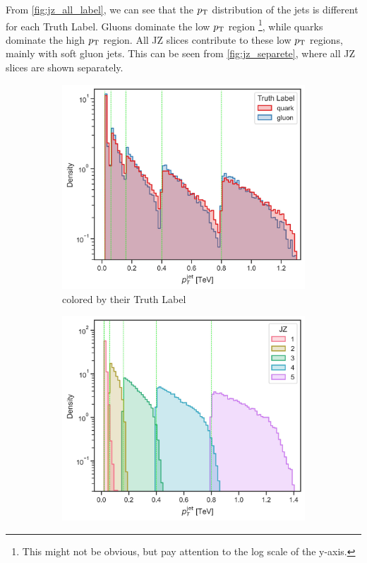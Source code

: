 From \cref{fig:jz_all_label}, we can see that the $p_\text{T}$ distribution of the jets is different for each Truth Label.
Gluons dominate the low $p_\text{T}$ region \footnote{This might not be obvious, but pay attention to the log scale of the y-axis.}, while quarks dominate the high $p_\text{T}$ region.
All JZ slices contribute to these low $p_\text{T}$ regions, mainly with soft gluon jets.
This can be seen from \cref{fig:jz_separete}, where all JZ slices are shown separately.
\begin{figure}[htb]
    \centering
    \begin{subfigure}[t]{0.49\textwidth}
        \centering
        \includegraphics[width=\linewidth]{src/plots/pt_jet_label_cut.jpg}
        \caption{colored by their Truth Label}
        \label{fig:jz_all_cut_label}
    \end{subfigure}
    \begin{subfigure}[t]{0.49\textwidth}
        \centering
        \includegraphics[width=\linewidth]{src/plots/pt_jet_jz_cut.jpg}

\end{subfigure}
\end{figure}
